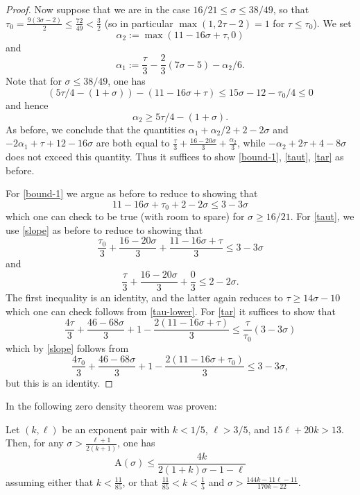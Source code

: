 \documentclass[a4paper, 10pt]{amsart}
\newcommand{\A}{\mathrm{A}}
\begin{document}
\begin{proof}
    Now suppose that we are in the case $16/21 \leq \sigma \leq 38/49$, so that $\tau_0 = \frac{9(3\sigma-2)}{2} \leq \frac{72}{49} < \frac{3}{2}$ (so in particular $\max(1,2\tau-2) = 1$ for $\tau \leq \tau_0$).  We set
    $$ \alpha_2 := \max(11 - 16 \sigma + \tau,0)$$
    and
    $$ \alpha_1 := \frac{\tau}{3} - \frac{2}{3} (7\sigma-5) - \alpha_2/6.$$
    Note that for $\sigma \leq 38/49$, one has
    $$ (5\tau/4 - (1+\sigma)) - (11 - 16 \sigma + \tau) \leq 15\sigma - 12 - \tau_0/4 \leq 0$$
    and hence
    $$ \alpha_2 \geq 5\tau/4 - (1+\sigma).$$
    As before, we conclude that the quantities $\alpha_1+\alpha_2/2 + 2-2\sigma$ and $-2\alpha_1 + \tau + 12 - 16 \sigma$ are both equal to $\frac{\tau}{3} + \frac{16-20\sigma}{3} + \frac{\alpha_2}{3}$, while $-\alpha_2 + 2\tau+4-8\sigma$ does not exceed this quantity.  Thus it suffices to show \eqref{bound-1}, \eqref{taut}, \eqref{tar} as before.

    For \eqref{bound-1} we argue as before to reduce to showing that
    $$ 11 - 16 \sigma + \tau_0 + 2 - 2 \sigma \leq 3 - 3\sigma$$
    which one can check to be true (with room to spare) for $\sigma \geq 16/21$.  For \eqref{taut}, we use \eqref{slope} as before to reduce to showing that
    $$ \frac{\tau_0}{3} + \frac{16-20\sigma}{3} + \frac{11 - 16 \sigma + \tau}{3} \leq 3 -3 \sigma$$
    and
    $$ \frac{\tau}{3} + \frac{16-20\sigma}{3} + \frac{0}{3} \leq 2 -2 \sigma.$$
    The first inequality is an identity, and the latter again reduces to  $\tau \geq 14\sigma-10$ which one can check follows from \eqref{tau-lower}.  For \eqref{tar} it suffices to show that
    $$ \frac{4\tau}{3} + \frac{46-68\sigma}{3}  + 1 - \frac{2(11 - 16 \sigma + \tau)}{3} \leq \frac{\tau}{\tau_0} (3-3\sigma)$$
    which by \eqref{slope} follows from
    $$ \frac{4\tau_0}{3} + \frac{46-68\sigma}{3}  + 1 - \frac{2(11 - 16 \sigma + \tau_0)}{3} \leq 3 - 3\sigma,$$
    but this is an identity.
\end{proof}

In \cite{bourgain_remarks_1995} the following zero density theorem was proven:

\begin{theorem}\label{bourgain-zd}\cite[Proposition 3]{bourgain_remarks_1995}  Let $(k,\ell)$ be an exponent pair with $k < 1/5$, $\ell > 3/5$, and $15\ell + 20k > 13$.  Then, for any $\sigma > \frac{\ell+1}{2(k+1)}$, one has
    $$ \A(\sigma) \leq \frac{4k}{2(1+k)\sigma - 1 - \ell}$$
    assuming either that $k < \frac{11}{85}$, or that $\frac{11}{85} < k < \frac{1}{5}$ and $\sigma > \frac{144k-11\ell-11}{170k -22}$.
\end{theorem}
\end{document}
